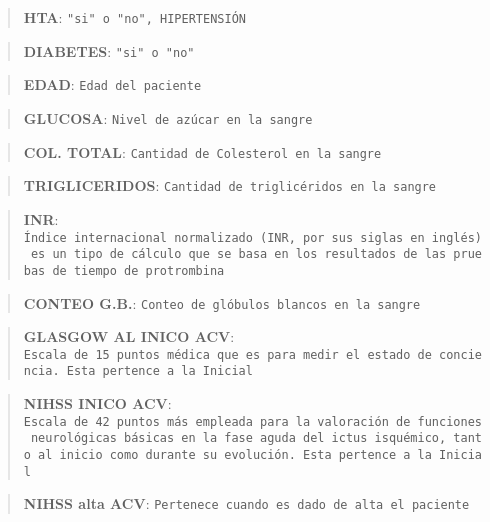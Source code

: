     \begin{quote}
\textbf{HTA}: \texttt{"si"\ o\ "no",\ HIPERTENSIÓN}
\end{quote}

\begin{quote}
\textbf{DIABETES}: \texttt{"si"\ o\ "no"}
\end{quote}

\begin{quote}
\textbf{EDAD}: \texttt{Edad\ del\ paciente}
\end{quote}

\begin{quote}
\textbf{GLUCOSA}: \texttt{Nivel\ de\ azúcar\ en\ la\ sangre}
\end{quote}

\begin{quote}
\textbf{COL. TOTAL}: \texttt{Cantidad\ de\ Colesterol\ en\ la\ sangre}
\end{quote}

\begin{quote}
\textbf{TRIGLICERIDOS}:
\texttt{Cantidad\ de\ triglicéridos\ en\ la\ sangre}
\end{quote}

\begin{quote}
\textbf{INR}:
\texttt{Índice\ internacional\ normalizado\ (INR,\ por\ sus\ siglas\ en\ inglés)\ es\ un\ tipo\ de\ cálculo\ que\ se\ basa\ en\ los\ resultados\ de\ las\ pruebas\ de\ tiempo\ de\ protrombina}
\end{quote}

\begin{quote}
\textbf{CONTEO G.B.}:
\texttt{Conteo\ de\ glóbulos\ blancos\ en\ la\ sangre}
\end{quote}

\begin{quote}
\textbf{GLASGOW AL INICO ACV}:
\texttt{Escala\ de\ 15\ puntos\ médica\ que\ es\ para\ medir\ el\ estado\ de\ conciencia.\ Esta\ pertence\ a\ la\ Inicial}
\end{quote}

\begin{quote}
\textbf{NIHSS INICO ACV}:
\texttt{Escala\ de\ 42\ puntos\ más\ empleada\ para\ la\ valoración\ de\ funciones\ neurológicas\ básicas\ en\ la\ fase\ aguda\ del\ ictus\ isquémico,\ tanto\ al\ inicio\ como\ durante\ su\ evolución.\ Esta\ pertence\ a\ la\ Inicial}
\end{quote}

\begin{quote}
\textbf{NIHSS alta ACV}:
\texttt{Pertenece\ cuando\ es\ dado\ de\ alta\ el\ paciente}
\end{quote}

